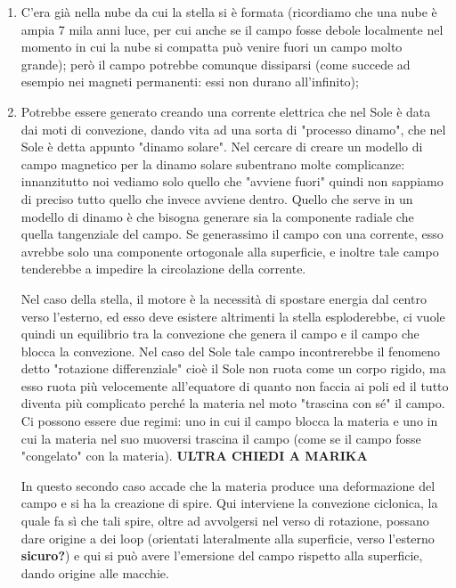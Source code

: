 \begin{enumerate}
    \item C'era già nella nube da cui la stella si è formata (ricordiamo che una nube è ampia 7 mila anni luce, per cui anche se il campo fosse debole localmente nel momento in cui la nube si compatta può venire fuori un campo molto grande); però il campo potrebbe comunque dissiparsi (come succede ad esempio nei magneti permanenti: essi non durano all'infinito);
    \item Potrebbe essere generato creando una corrente elettrica che nel Sole è data dai moti di convezione, dando vita ad una sorta di "processo dinamo", che nel Sole è detta appunto "dinamo solare". Nel cercare di creare un modello di campo magnetico per la dinamo solare subentrano molte complicanze: innanzitutto noi vediamo solo quello che "avviene fuori" quindi non sappiamo di preciso tutto quello che invece avviene dentro. Quello che serve in un modello di dinamo è che bisogna generare sia la componente radiale che quella tangenziale del campo. Se generassimo il campo con una corrente, esso avrebbe solo una componente ortogonale alla superficie, e inoltre tale campo tenderebbe a impedire la circolazione della corrente.
    
    Nel caso della stella, il motore è la necessità di spostare energia dal centro verso l'esterno, ed esso deve esistere altrimenti la stella esploderebbe, ci vuole quindi un equilibrio tra la convezione che genera il campo e il campo che blocca la convezione. Nel caso del Sole tale campo incontrerebbe il fenomeno detto "rotazione differenziale" cioè il Sole non ruota come un corpo rigido, ma esso ruota più velocemente all'equatore di quanto non faccia ai poli ed il tutto diventa più complicato perché la materia nel moto "trascina con sé" il campo. Ci possono essere due regimi: uno in cui il campo blocca la materia e uno in cui la materia nel suo muoversi trascina il campo (come se il campo fosse "congelato" con la materia). \textbf{ULTRA CHIEDI A MARIKA}

    In questo secondo caso accade che la materia produce una deformazione del campo e si ha la creazione di spire. Qui interviene la convezione ciclonica, la quale fa sì che tali spire, oltre ad avvolgersi nel verso di rotazione, possano dare origine a dei loop (orientati lateralmente alla superficie, verso l'esterno \textbf{sicuro?}) e qui si può avere l'emersione del campo rispetto alla superficie, dando origine alle macchie.
\end{enumerate}

